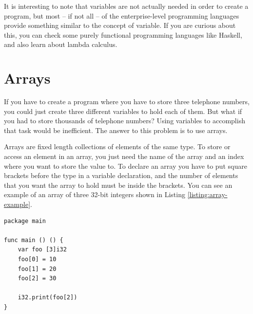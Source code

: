 \documentclass[11pt,fleqn,openany]{book} %
\begin{document}
It is interesting to note that variables are not actually needed in order to create a program, but most -- if not all -- of the enterprise-level programming languages provide something similar to the concept of variable. If you are curious about this, you can check some purely functional programming languages like Haskell, and also learn about lambda calculus.

\section{Arrays}


If you have to create a program where you have to store three telephone numbers, you could just create three different variables to hold each of them. But what if you had to store thousands of telephone numbers? Using variables to accomplish that task would be inefficient. The answer to this problem is to use arrays.

Arrays are fixed length collections of elements of the same type. To store or access an element in an array, you just need the name of the array and an index where you want to store the value to. To declare an array you have to put square brackets before the type in a variable declaration, and the number of elements that you want the array to hold must be inside the brackets. You can see an example of an array of three 32-bit integers shown in Listing \ref{listing:array-example}.

\begin{lstlisting}[caption={Array Example},captionpos=b,label={listing:array-example}]
package main

func main () () {
	var foo [3]i32
	foo[0] = 10
	foo[1] = 20
	foo[2] = 30

	i32.print(foo[2])
}
\end{lstlisting}
\end{document}
